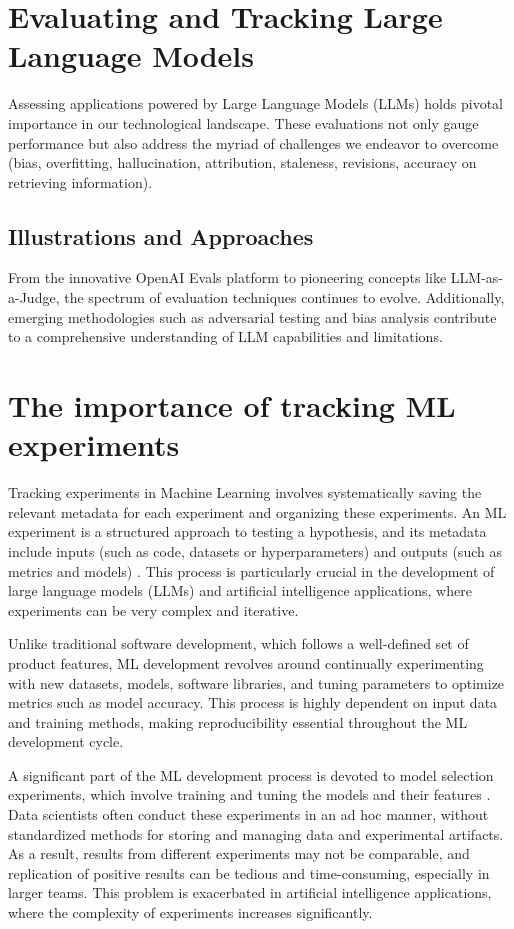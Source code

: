 \section{Evaluating and Tracking Large Language Models}
Assessing applications powered by Large Language Models (LLMs) holds pivotal importance in our technological landscape. These evaluations not only gauge performance but also address the myriad of challenges we endeavor to overcome (bias, overfitting, hallucination, attribution, staleness, revisions, accuracy on retrieving information).

\subsection{Illustrations and Approaches}

From the innovative OpenAI Evals platform to pioneering concepts like LLM-as-a-Judge, the spectrum of evaluation techniques continues to evolve. Additionally, emerging methodologies such as adversarial testing and bias analysis contribute to a comprehensive understanding of LLM capabilities and limitations.

\newpage

\section{The importance of tracking ML experiments}

Tracking experiments in Machine Learning involves systematically saving the relevant metadata for each experiment and organizing these experiments. An ML experiment is a structured approach to testing a hypothesis, and its metadata include inputs (such as code, datasets or hyperparameters) and outputs (such as metrics and models) \cite{wandb2023}. This process is particularly crucial in the development of large language models (LLMs) and artificial intelligence applications, where experiments can be very complex and iterative.

Unlike traditional software development, which follows a well-defined set of product features, ML development revolves around continually experimenting with new datasets, models, software libraries, and tuning parameters to optimize metrics such as model accuracy. This process is highly dependent on input data and training methods, making reproducibility essential throughout the ML development cycle.

A significant part of the ML development process is devoted to model selection experiments, which involve training and tuning the models and their features \cite{schelter2017automatically}. Data scientists often conduct these experiments in an ad hoc manner, without standardized methods for storing and managing data and experimental artifacts. As a result, results from different experiments may not be comparable, and replication of positive results can be tedious and time-consuming, especially in larger teams. This problem is exacerbated in artificial intelligence applications, where the complexity of experiments increases significantly.

